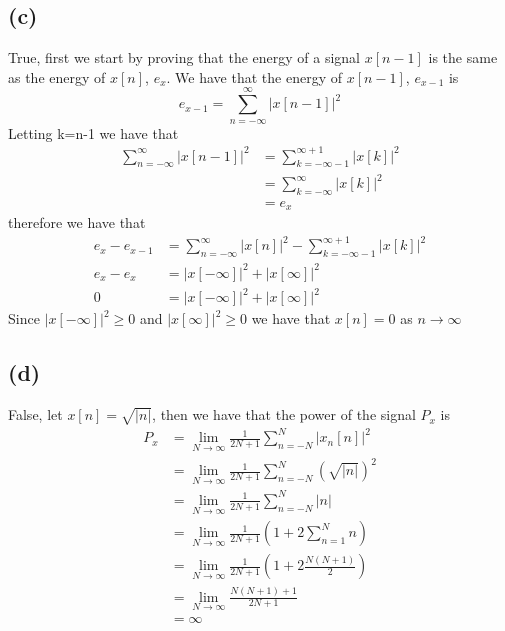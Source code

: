 \subsection*{(c)}
True, first we start by proving that the energy of a signal $x[n-1]$ is the 
same as the energy of $x[n]$, $e_x$. We have that the energy of $x[n-1]$, $e_{x-1}$ is 
$$e_{x-1}=\sum_{n=-\infty}^\infty|x[n-1]|^2$$
Letting k=n-1 we have that
\begin{align*}
    \sum_{n=-\infty}^\infty|x[n-1]|^2&=\sum_{k=-\infty-1}^{\infty+1}|x[k]|^2\\
    &=\sum_{k=-\infty}^{\infty}|x[k]|^2\\
    &=e_x
\end{align*}
therefore we have that 
\begin{align*}
e_x-e_{x-1}&=\sum_{n=-\infty}^\infty|x[n]|^2-\sum_{k=-\infty-1}^{\infty+1}|x[k]|^2\\
e_x-e_x&=|x[-\infty]|^2+|x[\infty]|^2\\
0&=|x[-\infty]|^2+|x[\infty]|^2
\end{align*}
Since $|x[-\infty]|^2\geq0$ and $|x[\infty]|^2\geq0$ we have that $x[n]=0$ as $n\to \infty$
\subsection*{(d)}
False, let $x[n]=\sqrt{|n|}$, then we have that the power of the signal $P_x$ is 
\begin{align*}
    P_x&=\lim_{N\rightarrow\infty}\frac{1}{2N+1}\sum_{n=-N}^N|x_n[n]|^2\\
    &=\lim_{N\rightarrow\infty}\frac{1}{2N+1}\sum_{n=-N}^N\left(\sqrt{|n|}\right)^2\\
    &=\lim_{N\rightarrow\infty}\frac{1}{2N+1}\sum_{n=-N}^N|n|\\
    &=\lim_{N\rightarrow\infty}\frac{1}{2N+1}\left(1+2\sum_{n=1}^Nn\right)\\
    &=\lim_{N\rightarrow\infty}\frac{1}{2N+1}\left(1+2\frac{N(N+1)}{2}\right)\\
    &=\lim_{N\rightarrow\infty}\frac{N(N+1)+1}{2N+1}\\
    &=\infty
\end{align*}
